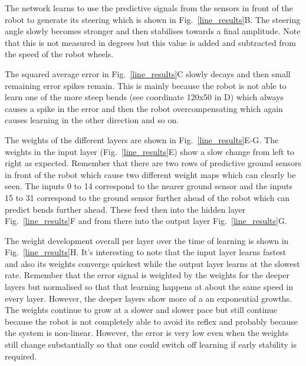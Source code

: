 \documentclass{llncs}
\begin{document}
The network learns to use the predictive signals from the sensors in
front of the robot to generate its steering which is shown in
Fig.~\ref{line_results}B.  The steering angle slowly becomes stronger and
then stabilises towards a final amplitude. Note that this is not
measured in degrees but this value is added and subtracted from the
speed of the robot wheels.

The squared average error in Fig.~\ref{line_results}C slowly decays
and then small remaining error spikes remain. This is mainly because
the robot is not able to learn one of the more steep bends (see
coordinate 120x50 in D) which always causes a spike in the error and
then the robot overcompensating which again causes learning in the
other direction and so on.

The weights of the different layers are shown in
Fig.~\ref{line_results}E-G.  The weights in the input layer
(Fig.~\ref{line_results}E) show a slow change from left to right as
expected. Remember that there are two rows of predictive ground
sensors in front of the robot which cause two different weight maps
which can clearly be seen. The inputs 0 to 14 correspond to the nearer
ground sensor and the inputs 15 to 31 correspond to the ground sensor
further ahead of the robot which can predict bends further
ahead. These feed then into the hidden layer Fig.~\ref{line_results}F
and from there into the output layer Fig.~\ref{line_results}G.

The weight development overall per layer over the time of learning
is shown in Fig.~\ref{line_results}H. It's interesting to note
that the input layer learns fastest and also its weights converge
quickest while the output layer learns at the slowest rate. Remember
that the error signal is weighted by the weights for the deeper
layers but normalised so that that learning happens at about the
same speed in every layer. However, the deeper layers show more
of a an exponential growths. The weights continue to grow at a slower
and slower pace but still continue because the robot is not completely
able to avoid its reflex and probably because the system is non-linear.
However, the error is very low even when the weights still change
substantially so that one could switch off learning if early stability
is required.
\end{document}
